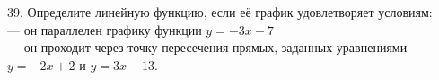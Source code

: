 39. Определите линейную функцию, если её график удовлетворяет условиям:\\
--- он параллелен графику функции $y=-3x-7$\\
--- он проходит через точку пересечения прямых, заданных уравнениями $y=-2x+2$ и $y=3x-13.$\\
